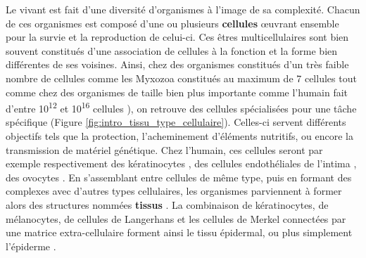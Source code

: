 Le vivant est fait d'une diversité d'organismes à l'image de sa complexité. Chacun de ces organismes est composé d'une ou plusieurs \textbf{cellules} œuvrant ensemble pour la survie et la reproduction de celui-ci. Ces êtres multicellulaires sont bien souvent constitués d’une association de cellules à la fonction et la forme bien différentes de ses voisines. Ainsi, chez des organismes constitués d'un très faible nombre de cellules comme les Myxozoa constitués au maximum de 7 cellules \cite{Morris2010Aug} tout comme chez des organismes de taille bien plus importante comme l'humain fait d'entre 10\textsuperscript{12} et 10\textsuperscript{16} cellules \cite{Bianconi2013}), on retrouve des cellules spécialisées pour une tâche spécifique \cite{Panina2020Sep} (Figure \ref{fig:intro_tissu_type_cellulaire}). Celles-ci servent différents objectifs tels que la protection, l'acheminement d'éléments nutritifs, ou encore la transmission de matériel génétique. Chez l’humain, ces cellules seront par exemple respectivement des kératinocytes \cite{Yuki2007Apr}, des cellules endothéliales de l’intima \cite{Yuan1991Aug}, des ovocytes \cite{Trounson2013}. En s’assemblant entre cellules de même type, puis en formant des complexes avec d’autres types cellulaires, les organismes parviennent à former alors des structures nommées \textbf{tissus} \cite{Hekselman2020Mar}. La combinaison de kératinocytes, de mélanocytes, de cellules de Langerhans et les cellules de Merkel connectées par une matrice extra-cellulaire forment ainsi le tissu épidermal, ou plus simplement l’épiderme \cite{Bettley1965}.



